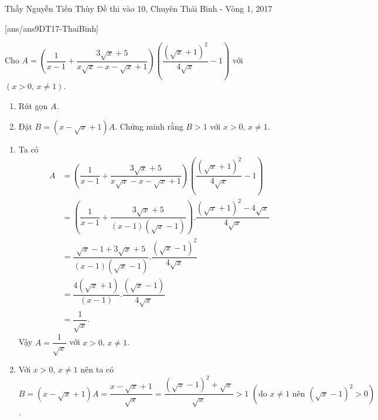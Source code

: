 \begin{name}
{Thầy  Nguyễn Tiến Thùy}
{Đề thi vào 10, Chuyên Thái Bình - Vòng 1, 2017}
\end{name}
\setcounter{ex}{0}
[ans/ans9DT17-ThaiBinh]
\begin{ex}%
Cho $A=\left(\dfrac{1}{x-1}+\dfrac{3\sqrt{x}+5}{x\sqrt{x}-x-\sqrt{x}+1}\right)\left(\dfrac{\left(\sqrt{x}+1\right)^2}{4\sqrt{x}}-1\right)$ với $(x>0,\, x\ne 1)$.
    \hfill
    \begin{enumerate}
        \item Rút gọn $A$. 
        \item Đặt $B=(x-\sqrt{x}+1)A$. Chứng minh rằng $B>1$ với $x>0,\, x\ne 1$. 
    \end{enumerate}
\loigiai
    {
    \begin{enumerate}
        \item Ta có
        	\begin{align*}
        	A&= \left(\dfrac{1}{x-1}+\dfrac{3\sqrt{x}+5}{x\sqrt{x}-x-\sqrt{x}+1}\right)\left(\dfrac{\left(\sqrt{x}+1\right)^2}{4\sqrt{x}}-1\right)\\
        	 &= \left(\dfrac{1}{x-1}+\dfrac{3\sqrt{x}+5}{(x-1)(\sqrt{x}-1)}\right).\dfrac{\left(\sqrt{x}+1\right)^2-4\sqrt{x}}{4\sqrt{x}}\\
        	 &= \dfrac{\sqrt{x}-1+3\sqrt{x}+5}{(x-1)(\sqrt{x}-1)}.\dfrac{\left(\sqrt{x}-1\right)^2}{4\sqrt{x}}\\
        	 &= \dfrac{4(\sqrt{x}+1)}{(x-1)}.\dfrac{\left(\sqrt{x}-1\right)}{4\sqrt{x}}\\
        	 &= \dfrac{1}{\sqrt{x}}.
			\end{align*}
			  Vậy $A=\dfrac{1}{\sqrt{x}}$ với $x>0$, $x\ne 1$.    	 
        \item Với $x>0$, $x\ne 1$ nên ta có\\
        $B=(x-\sqrt{x}+1)A=\dfrac{x-\sqrt{x}+1}{\sqrt{x}}=\dfrac{(\sqrt{x}-1)^2+\sqrt{x}}{\sqrt{x}}>1\,\, \left(\mbox{do } x\ne 1 \mbox{ nên } (\sqrt{x}-1)^2>0\right)$.
    \end{enumerate}
    }
\end{ex}

